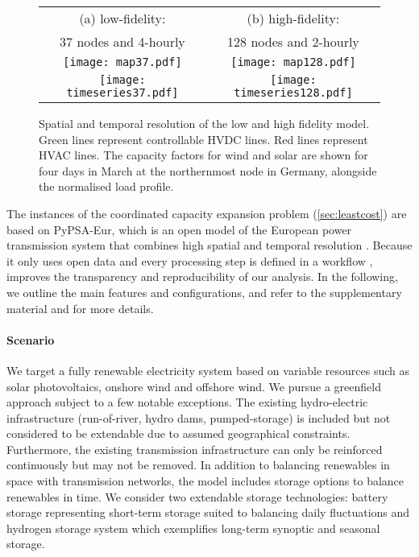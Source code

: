 \begin{SCfigure}
        \begin{tabular}{cc}
            \footnotesize (a) low-fidelity: & \footnotesize (b) high-fidelity: \\
            \footnotesize 37 nodes and 4-hourly & \footnotesize 128 nodes and 2-hourly \\
            \texttt{[image: map37.pdf]} &
            \texttt{[image: map128.pdf]} \\
            \texttt{[image: timeseries37.pdf]} &
            \texttt{[image: timeseries128.pdf]} \\
        \end{tabular}
    \caption[Spatial and temporal resolution of the low and high fidelity model]{Spatial and temporal resolution of the low and high fidelity model.
    Green lines represent controllable HVDC lines. Red lines represent HVAC lines.
    The capacity factors for wind and solar are shown for four days in March
    at the northernmost node in Germany, alongside the normalised load profile.}
    \label{fig:pypsaeur}
\end{SCfigure}


The instances of the coordinated capacity expansion problem (\cref{sec:leastcost})
 are based on \mbox{PyPSA-Eur},
which is an open model of the European power transmission system
that combines high spatial and temporal resolution \cite{pypsaeur}.
Because it only uses open data
and every processing step is defined in a workflow \cite{snakemake},
improves the transparency and reproducibility of our analysis.
In the following, we outline the main features and configurations, and
refer to the supplementary material and \cite{pypsaeur} for more details.

\paragraph{Scenario}
We target a fully renewable electricity system based on variable resources
such as solar photovoltaics, onshore wind and offshore wind.
We pursue a greenfield approach subject to a few notable exceptions.
The existing hydro-electric infrastructure (run-of-river, hydro dams, pumped-storage)
is included but not considered to be extendable due to assumed geographical constraints.
Furthermore, the existing transmission infrastructure can only
be reinforced continuously but may not be removed.
In addition to balancing renewables in space with transmission networks,
the model includes storage options to balance renewables in time.
We consider two extendable storage technologies:
battery storage representing short-term storage suited to balancing daily fluctuations and
hydrogen storage system which exemplifies long-term synoptic and seasonal storage.

